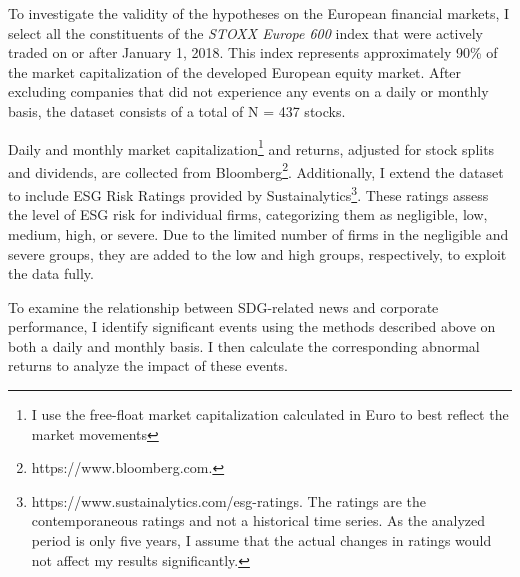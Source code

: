 To investigate the validity of the hypotheses on the European financial markets, I select all the constituents of the \textit{STOXX Europe 600} index that were actively traded on or after January 1, 2018. This index represents approximately 90\% of the market capitalization of the developed European equity market. After excluding companies that did not experience any events on a daily or monthly basis, the dataset consists of a total of N = 437 stocks.  

Daily and monthly market capitalization\footnote{I use the free-float market capitalization calculated in Euro to best reflect the market movements} and returns, adjusted for stock splits and dividends, are collected from Bloomberg\footnote{https://www.bloomberg.com.}. Additionally, I extend the dataset to include ESG Risk Ratings provided by Sustainalytics\footnote{https://www.sustainalytics.com/esg-ratings. The ratings are the contemporaneous ratings and not a historical time series. As the analyzed period is only five years, I assume that the actual changes in ratings would not affect my results significantly.}. These ratings assess the level of ESG risk for individual firms, categorizing them as negligible, low, medium, high, or severe. Due to the limited number of firms in the negligible and severe groups, they are added to the low and high groups, respectively, to exploit the data fully. 

To examine the relationship between SDG-related news and corporate performance, I identify significant events using the methods described above on both a daily and monthly basis. I then calculate the corresponding abnormal returns to analyze the impact of these events. 